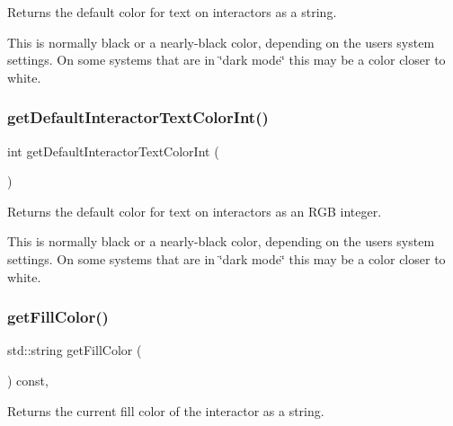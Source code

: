 Returns the default color for text on interactors as a string. 

This is normally black or a nearly-\/black color, depending on the user\textquotesingle{}s system settings. On some systems that are in \char`\"{}dark mode\char`\"{} this may be a color closer to white. \mbox{\label{classsgl_1_1GWindow_a66c284abc8a53870127d079f904489c5}} 
\subsubsection{\texorpdfstring{get\+Default\+Interactor\+Text\+Color\+Int()}{getDefaultInteractorTextColorInt()}}
{\footnotesize\ttfamily int get\+Default\+Interactor\+Text\+Color\+Int (\begin{DoxyParamCaption}{ }\end{DoxyParamCaption})\hspace{0.3cm}{\ttfamily [static]}}



Returns the default color for text on interactors as an R\+GB integer. 

This is normally black or a nearly-\/black color, depending on the user\textquotesingle{}s system settings. On some systems that are in \char`\"{}dark mode\char`\"{} this may be a color closer to white. \mbox{\label{classsgl_1_1GDrawingSurface_a76f6964a11fde7c78e9751be184e1a3c}} 
\subsubsection{\texorpdfstring{get\+Fill\+Color()}{getFillColor()}}
{\footnotesize\ttfamily std\+::string get\+Fill\+Color (\begin{DoxyParamCaption}{ }\end{DoxyParamCaption}) const\hspace{0.3cm}{\ttfamily [virtual]}, {\ttfamily [inherited]}}



Returns the current fill color of the interactor as a string. 

